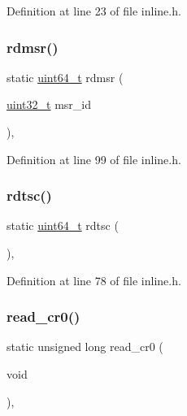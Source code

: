 Definition at line 23 of file inline.\+h.

\mbox{\label{a00035_a6fa28502e33e305c4335fe3032dc7799_a6fa28502e33e305c4335fe3032dc7799}} 
\subsubsection{\texorpdfstring{rdmsr()}{rdmsr()}}
{\footnotesize\ttfamily static \hyperlink{a00032_aa232ecf786a74ce5363c36c10798d2b1_aa232ecf786a74ce5363c36c10798d2b1}{uint64\+\_\+t} rdmsr (\begin{DoxyParamCaption}\item[{\hyperlink{a00032_a435d1572bf3f880d55459d9805097f62_a435d1572bf3f880d55459d9805097f62}{uint32\+\_\+t}}]{msr\+\_\+id }\end{DoxyParamCaption})\hspace{0.3cm}{\ttfamily [inline]}, {\ttfamily [static]}}



Definition at line 99 of file inline.\+h.

\mbox{\label{a00035_a47b9d70be3022fd0b5687d9794ca47bc_a47b9d70be3022fd0b5687d9794ca47bc}} 
\subsubsection{\texorpdfstring{rdtsc()}{rdtsc()}}
{\footnotesize\ttfamily static \hyperlink{a00032_aa232ecf786a74ce5363c36c10798d2b1_aa232ecf786a74ce5363c36c10798d2b1}{uint64\+\_\+t} rdtsc (\begin{DoxyParamCaption}{ }\end{DoxyParamCaption})\hspace{0.3cm}{\ttfamily [inline]}, {\ttfamily [static]}}



Definition at line 78 of file inline.\+h.

\mbox{\label{a00035_ac85e095222f364961e091702bb6bc2ff_ac85e095222f364961e091702bb6bc2ff}} 
\subsubsection{\texorpdfstring{read\+\_\+cr0()}{read\_cr0()}}
{\footnotesize\ttfamily static unsigned long read\+\_\+cr0 (\begin{DoxyParamCaption}\item[{void}]{ }\end{DoxyParamCaption})\hspace{0.3cm}{\ttfamily [inline]}, {\ttfamily [static]}}



